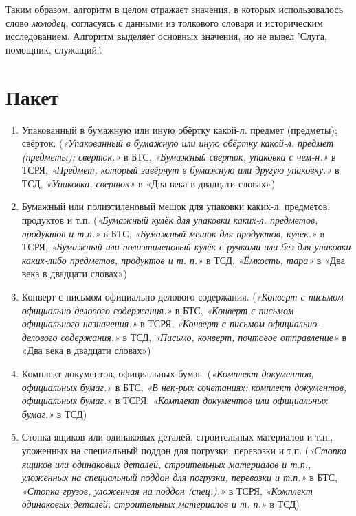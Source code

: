 Таким образом, алгоритм в целом отражает значения, в которых использовалось
слово \textit{молодец}, согласуясь с данными из толкового словаря и историческим исследованием.
Алгоритм выделяет основных значения, но не вывел ’Слуга, помощник, служащий.’.

\section*{Пакет}

\begin{enumerate}
    \item Упакованный в бумажную или иную обёртку какой-л. предмет (предметы); свёрток.
(\textit{«Упакованный в бумажную или иную обёртку какой-л. предмет (предметы); свёрток.»} в БТС,
\textit{«Бумажный сверток, упаковка с чем-н.»} в ТСРЯ,
\textit{«Предмет, который завёрнут в бумажную или другую упаковку.»} в ТСД,
\textit{«Упаковка, сверток»} в «Два века в двадцати словах»)

    \item Бумажный или полиэтиленовый мешок для упаковки каких-л. предметов, продуктов и т.п.
(\textit{«Бумажный кулёк для упаковки каких-л. предметов, продуктов и т.п.»} в БТС,
\textit{«Бумажный мешок для продуктов, кулек.»} в ТСРЯ,
\textit{«Бумажный или полиэтиленовый кулёк с ручками или без для упаковки каких-либо предметов, продуктов и т. п.»} в ТСД, \textit{«Ёмкость, тара»} в «Два века в двадцати словах»)

    \item Конверт с письмом официально-делового содержания.
(\textit{«Конверт с письмом официально-делового содержания.»} в БТС,
\textit{«Конверт с письмом официального назначения.»} в ТСРЯ,
\textit{«Конверт с письмом официально-делового содержания.»} в ТСД,
\textit{«Письмо, конверт, почтовое отправление»} в «Два века в двадцати словах»)

    \item Комплект документов, официальных бумаг.
(\textit{«Комплект документов, официальных бумаг.»} в БТС,
\textit{«В нек-рых сочетаниях: комплект документов, официальных бумаг.»} в ТСРЯ,
\textit{«Комплект документов или официальных бумаг.»} в ТСД)

    \item Стопка ящиков или одинаковых деталей, строительных материалов и т.п., уложенных на специальный поддон для погрузки, перевозки и т.п.
(\textit{«Стопка ящиков или одинаковых деталей, строительных материалов и т.п., уложенных на специальный поддон для погрузки, перевозки и т.п.»} в БТС,
\textit{«Стопка грузов, уложенная на поддон (спец.).»} в ТСРЯ,
\textit{«Комплект одинаковых деталей, строительных материалов и т. п.»} в ТСД)


\end{enumerate}

